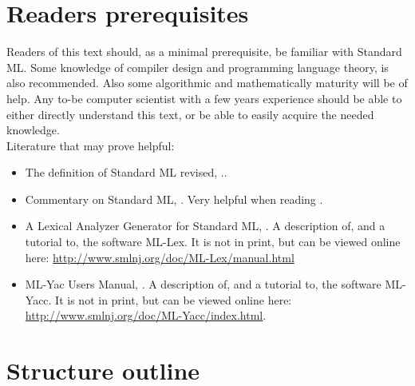 \section{Readers prerequisites}

Readers of this text should, as a minimal prerequisite, be familiar with
Standard ML. Some knowledge of compiler design and programming language theory,
is also recommended. Also some algorithmic and mathematically maturity will be
of help. Any to-be computer scientist with a few years experience should be able
to either directly understand this text, or be able to easily acquire the needed
knowledge.\\

\noindent
Literature that may prove helpful:

\begin{itemize}
\item {The definition of Standard ML revised, \cite{SML97}.}.
\item {Commentary on Standard ML, \cite{SMLCOMM}.} Very helpful when reading
  \cite{SML97}.
\item {A Lexical Analyzer Generator for Standard ML, \cite{MLLEX}.} A
  description of, and a tutorial to, the software ML-Lex. It is not in print,
  but can be viewed online here:
  \url{http://www.smlnj.org/doc/ML-Lex/manual.html}
\item {ML-Yac Users Manual, \cite{MLYACC}.} A description of, and a tutorial to, the
  software ML-Yacc. It is not in print, but can be viewed online here:
  \url{http://www.smlnj.org/doc/ML-Yacc/index.html}.
\end{itemize}


\section{Structure outline}


